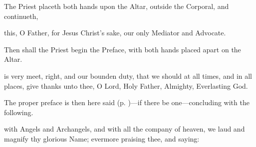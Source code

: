 \begin{rubric}
	 The Priest placeth both hands upon the Altar, outside the Corporal, and continueth,
\end{rubric}
 this, O Father, for Jesus Christ's sake, our only Mediator and Advocate.\par
{}
\clearpage
{}
\begin{rubric}
    Then shall the Priest begin the Preface, with both hands placed apart on the Altar.
\end{rubric}
 is very meet, right, and our bounden duty, that we should at all times, and in all places, give thanks unto thee, O Lord, Holy Father, Almighty, Everlasting God.
\begin{rubric}
    The proper preface is then here said (p. \pageref{prefaces})---if there be one---concluding with the following.
\end{rubric}
\label{PrefaceEnding}
 with Angels and Archangels, and with all the company of heaven, we laud and magnify thy glorious Name; evermore praising thee, and saying:%

